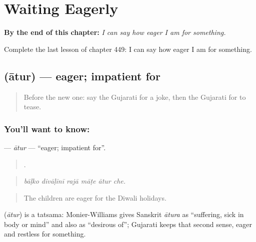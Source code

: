 
\chapter{Waiting Eagerly}
\label{ch:gu-waiting-eagerly}

\begin{chapteropening}
\textbf{By the end of this chapter:} \emph{I can say how eager I am for something.}

Complete the last lesson of chapter 449: I can say how eager I am for something.
\end{chapteropening}

\section[\texorpdfstring{\gu{આતુર} (ātur)}{આતુર (ātur)}]{ (ātur) — eager; impatient for}

\label{lesson:GU-C449-atur}



\begin{quote}
Before the new one: say the Gujarati for a joke, then the Gujarati for to tease.
\end{quote}

\subsection*{You'll want to know: }
\textbf{} — \emph{ātur} — \textquotedblleft{}eager; impatient for\textquotedblright{}.

\begin{quote}
     .
\end{quote}

\begin{quote}
\emph{bāḷko divāḷīnī rajā māṭe ātur che.}
\end{quote}

\begin{quote}
The children are eager for the Diwali holidays.
\end{quote}

\begin{cousinweb}
\textbf{} (\emph{ātur}) is a tatsama: Monier-Williams gives Sanskrit \emph{ātura} as \textquotedblleft{}suffering, sick in body or mind\textquotedblright{} and also as \textquotedblleft{}desirous of\textquotedblright{}; Gujarati keeps that second sense, eager and restless for something.
\end{cousinweb}

